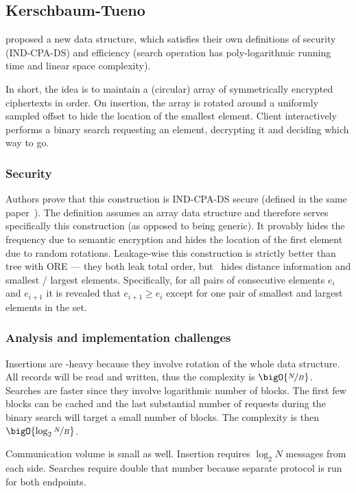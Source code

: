 \subsection{Kerschbaum-Tueno}

	\textcite{florian-protocol} proposed a new data structure, which satisfies their own definitions of security (IND-CPA-DS) and efficiency (search operation has poly\hyp{}logarithmic running time and linear space complexity).

	In short, the idea is to maintain a (circular) array of symmetrically encrypted ciphertexts in order.
	On insertion, the array is rotated around a uniformly sampled offset to hide the location of the smallest element.
	Client interactively performs a binary search requesting an element, decrypting it and deciding which way to go.

	\subsubsection{Security}
		Authors prove that this construction is IND-CPA-DS secure (defined in the same paper~\cite{florian-protocol}).
		The definition assumes an array data structure and therefore serves specifically this construction (as opposed to being generic).
		It provably hides the frequency due to semantic encryption and hides the location of the first element due to random rotations.
		Leakage-wise this construction is strictly better than {\BPlus} tree with ORE --- they both leak total order, but~\cite{florian-protocol} hides distance information and smallest / largest elements.
		Specifically, for all pairs of consecutive elements $e_i$ and $e_{i+1}$ it is revealed that $e_{i+1} \ge e_i$ except for one pair of smallest and largest elements in the set.

	\subsubsection{Analysis and implementation challenges}

		Insertions are {\IO}-heavy because they involve rotation of the whole data structure.
		All records will be read and written, thus the complexity is $\bigO{\nicefrac{N}{B}}$.
		Searches are faster since they involve logarithmic number of blocks.
		The first few blocks can be cached and the last substantial number of requests during the binary search will target a small number of blocks.
		The complexity is then $\bigO{\log_2 \nicefrac{N}{B}}$.

		Communication volume is small as well.
		Insertion requires $\log_2 N$ messages from each side.
		Searches require double that number because separate protocol is run for both endpoints.

